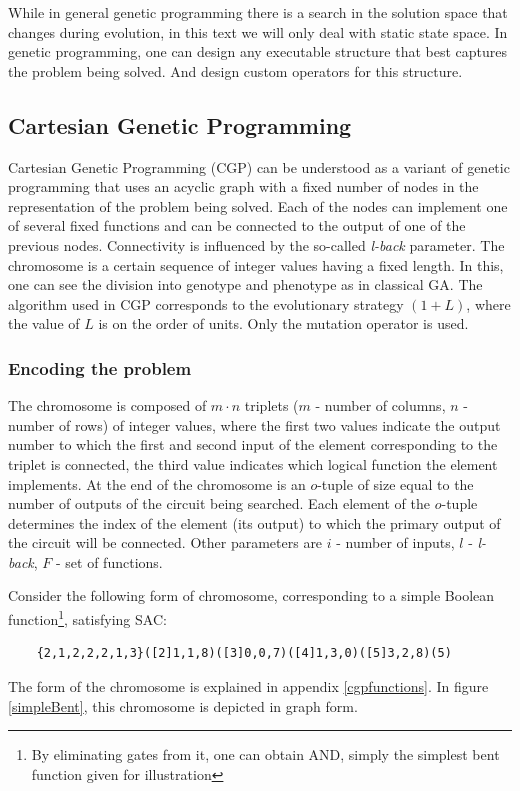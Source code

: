 While in general genetic programming there is a search in the solution space that
changes during evolution, in this text we will only deal with static state space.
In genetic programming, one can design any executable structure that best
captures the problem being solved. And design custom operators for this structure.


\subsection{Cartesian Genetic Programming}\label{algorithmCGP}
Cartesian Genetic Programming (CGP) \cite{vasicek} can be understood as a variant of genetic programming
that uses an acyclic graph with a fixed number of nodes in the representation of the problem being solved.
Each of the nodes can implement one of several fixed functions and can be connected to the output of one of the previous nodes.
Connectivity is influenced by the so-called \emph{l-back} parameter.
The chromosome is a certain sequence of integer values having a fixed length. In this, one can
see the division into genotype and phenotype as in classical GA.
The algorithm used in CGP corresponds to the evolutionary strategy $(1+L)$,
where the value of $L$ is on the order of units.
Only the mutation operator is used.

\subsubsection{Encoding the problem}
The chromosome is composed of $m \cdot n$ triplets ($m$ - number of columns, $n$ - number of rows) of integer values, where the first two values indicate the output number to which the first and second input of the element corresponding to the triplet is connected, the third value indicates which logical function the element implements.
At the end of the chromosome is an $o$-tuple of size equal to the number of outputs of the circuit being searched.
Each element of the $o$-tuple determines the index of the element (its output)
to which the primary output of the circuit will be connected. Other parameters are $i$ - number of inputs,
$l$ - \emph{l-back}, $F$ - set of functions.

Consider the following form of chromosome,
corresponding to a simple Boolean function\footnote{By eliminating gates from it, one can obtain AND,
simply the simplest bent function given for illustration},
satisfying SAC:
\begin{verbatim}
    {2,1,2,2,2,1,3}([2]1,1,8)([3]0,0,7)([4]1,3,0)([5]3,2,8)(5)
\end{verbatim}
The form of the chromosome is explained in appendix \ref{cgpfunctions}.
In figure \ref{simpleBent}, this chromosome is depicted in graph form.

